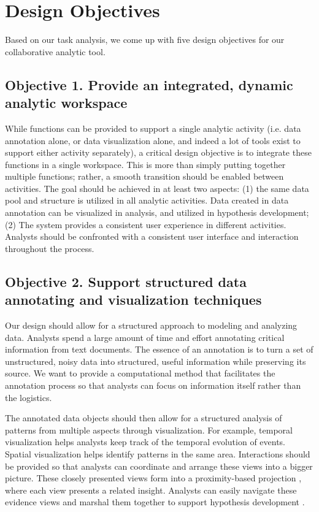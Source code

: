 \section{Design Objectives}\label{design-objectives}

Based on our task analysis, we come up with five design objectives for our collaborative analytic tool.

\subsection{Objective 1. Provide an integrated, dynamic  analytic workspace}

While functions can be provided to support a single analytic activity (i.e. data annotation alone, or data visualization alone, and indeed a lot of tools exist to support either activity separately), a critical design objective is to integrate these functions in a single workspace. This is more than simply putting together multiple functions; rather, a smooth transition should be enabled between activities. The goal should be achieved in at least two aspects: (1)
the same data pool and structure is utilized in all analytic activities. Data
created in data annotation can be visualized in analysis, and utilized in
hypothesis development; (2) The system provides a consistent user experience in
different activities. Analysts should be confronted with a consistent user
interface and interaction throughout the process.


\subsection{Objective 2. Support structured data annotating and visualization techniques}

Our design should allow for a structured approach to modeling and analyzing data. Analysts spend a large amount of time and effort annotating critical information from text documents. The essence of an annotation is to turn a set of unstructured, noisy data into structured, useful information while preserving its source. We want to provide a computational method that facilitates the annotation process so that analysts can focus on information itself rather than the logistics. 

The annotated data objects should then allow for a structured analysis of patterns from multiple aspects through visualization. For example, temporal visualization helps analysts keep track of the temporal evolution
of events. Spatial visualization helps identify patterns in the same area. Interactions should be provided so that analysts can coordinate and arrange these views into a bigger picture. These closely presented views form into a proximity-based projection \citep{Kang2014a}, where each view presents a related insight. Analysts can easily navigate these evidence views and marshal them together to support hypothesis development \citep{Pirolli2005}. 

